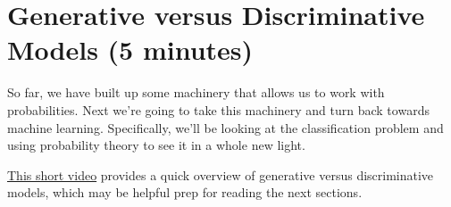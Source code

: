 \documentclass[assignment03_Solutions]{subfiles}
\begin{document}
%
%
%



\section{Generative versus Discriminative Models (5 minutes)}
So far, we have built up some machinery that allows us to work with probabilities.  Next we're going to take this machinery and turn back towards machine learning.  Specifically, we'll be looking at the classification problem and using probability theory to see it in a whole new light.

\href{https://www.youtube.com/watch?v=HHNESCbZqUg}{This short video} provides a quick overview of generative versus discriminative models, which may be helpful prep for reading the next sections.
\end{document}
